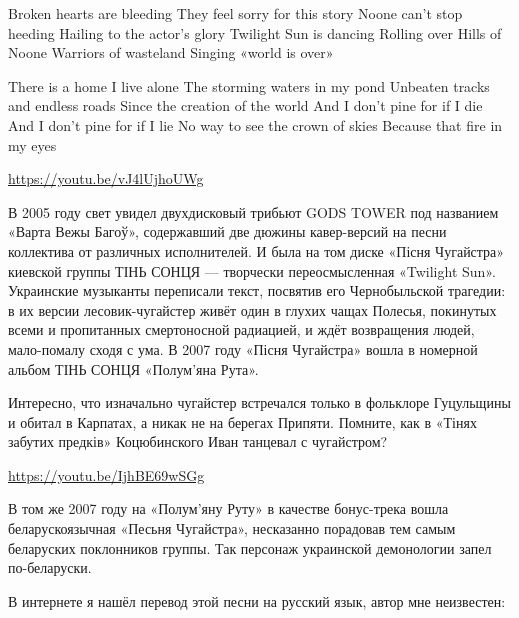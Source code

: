 Broken hearts are bleeding
They feel sorry for this story
Noone can't stop heeding
Hailing to the actor's glory
Twilight Sun is dancing
Rolling over Hills of Noone
Warriors of wasteland
Singing «world is over»

There is a home I live alone
The storming waters in my pond
Unbeaten tracks and endless roads
Since the creation of the world
And I don't pine for if I die
And I don't pine for if I lie
No way to see the crown of skies
Because that fire in my eyes

\url{https://youtu.be/vJ4lUjhoUWg}

В 2005 году свет увидел двухдисковый трибьют GODS TOWER под названием «Варта
Вежы Багоў», содержавший две дюжины кавер-версий на песни коллектива от
различных исполнителей. И была на том диске «Пісня Чугайстра» киевской группы
ТІНЬ СОНЦЯ --- творчески переосмысленная «Twilight Sun». Украинские музыканты
переписали текст, посвятив его Чернобыльской трагедии: в их версии
лесовик-чугайстер живёт один в глухих чащах Полесья, покинутых всеми и
пропитанных смертоносной радиацией, и ждёт возвращения людей, мало-помалу сходя
с ума. В 2007 году «Пісня Чугайстра» вошла в номерной альбом ТІНЬ СОНЦЯ
«Полум’яна Рута».

Интересно, что изначально чугайстер встречался только в фольклоре Гуцульщины и
обитал в Карпатах, а никак не на берегах Припяти. Помните, как в «Тінях забутих
предків» Коцюбинского Иван танцевал с чугайстром?

\url{https://youtu.be/IjhBE69wSGg}

В том же 2007 году на «Полум’яну Руту» в качестве бонус-трека вошла
беларускоязычная «Песьня Чугайстра», несказанно порадовав тем самым беларуских
поклонников группы. Так персонаж украинской демонологии запел по-беларуски.

В интернете я нашёл перевод этой песни на русский язык, автор мне неизвестен:
